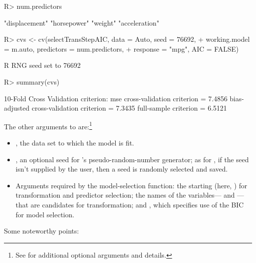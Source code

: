 \documentclass[
]{jss}
\providecommand{\tightlist}{%
  \setlength{\itemsep}{0pt}\setlength{\parskip}{0pt}}
\begin{document}
\begin{CodeChunk}
\begin{CodeInput}
R> num.predictors
\end{CodeInput}
\begin{CodeOutput}
[1] "displacement" "horsepower"   "weight"       "acceleration"
\end{CodeOutput}
\begin{CodeInput}
R> cvs <- cv(selectTransStepAIC, data = Auto, seed = 76692,
+           working.model = m.auto, predictors = num.predictors,
+           response = "mpg", AIC = FALSE)
\end{CodeInput}
\begin{CodeOutput}
R RNG seed set to 76692
\end{CodeOutput}
\begin{CodeInput}
R> summary(cvs)
\end{CodeInput}
\begin{CodeOutput}
10-Fold Cross Validation
criterion: mse
cross-validation criterion = 7.4856
bias-adjusted cross-validation criterion = 7.3435
full-sample criterion = 6.5121
\end{CodeOutput}
\end{CodeChunk}

The other arguments to  are:\footnote{See 
  for additional optional arguments and details.}

\begin{itemize}
\tightlist
\item
  , the data set to which the model is fit.
\item
  , an optional seed for 's pseudo-random-number
  generator; as for , if the seed isn't supplied by the user,
  then a seed is randomly selected and saved.
\item
  Arguments required by the model-selection function: the starting
   (here, ) for transformation and
  predictor selection; the names of the variables---
  and ---that are candidates for transformation; and
  , which specifies use of the BIC for model
  selection.
\end{itemize}

Some noteworthy points:
\end{document}
